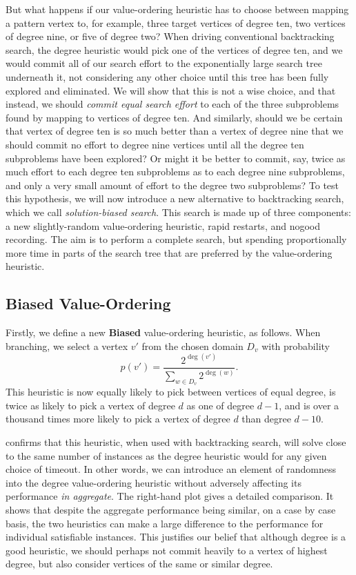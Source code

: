 \documentclass[runningheads]{llncs}
\begin{document}
But what happens if our value-ordering heuristic has to choose between mapping a pattern vertex to,
for example, three target vertices of degree ten, two vertices of degree nine, or five of degree
two? When driving conventional backtracking search, the degree heuristic would pick one of the
vertices of degree ten, and we would commit all of our search effort to the exponentially large
search tree underneath it, not considering any other choice until this tree has been fully explored
and eliminated.  We will show that this is not a wise choice, and that instead, we should
\emph{commit equal search effort} to each of the three subproblems found by mapping to vertices of
degree ten.  And similarly, should we be certain that vertex of degree ten is so much better than a
vertex of degree nine that we should commit no effort to degree nine vertices until all the degree
ten subproblems have been explored? Or might it be better to commit, say, twice as much effort to
each degree ten subproblems as to each degree nine subproblems, and only a very small amount of
effort to the degree two subproblems?  To test this hypothesis, we will now introduce a new
alternative to backtracking search, which we call \emph{solution-biased search}.  This search is
made up of three components: a new slightly-random value-ordering heuristic, rapid restarts, and
nogood recording. The aim is to perform a complete search, but spending proportionally more time in
parts of the search tree that are preferred by the value-ordering heuristic.

\subsection{Biased Value-Ordering}

Firstly, we define a new \textbf{Biased} value-ordering heuristic, as follows. When branching, we
select a vertex $v'$ from the chosen domain $D_v$ with probability \[ p(v') =
\frac{2^{\deg(v')}}{\sum_{w \in D_v}{2^{\deg(w)}}} \text{.} \] This heuristic is now equally likely
to pick between vertices of equal degree, is twice as likely to pick a vertex of degree $d$ as one
of degree $d - 1$, and is over a thousand times more likely to pick a vertex of degree $d$ than
degree $d - 10$.

 confirms that this heuristic, when used with backtracking
search, will solve close to the same number of instances as the degree heuristic would for any given
choice of timeout. In other words, we can introduce an element of randomness into the degree
value-ordering heuristic without adversely affecting its performance \emph{in aggregate}.  The
right-hand plot gives a detailed comparison. It shows that despite the aggregate performance being
similar, on a case by case basis, the two heuristics can make a large difference to the performance
for individual satisfiable instances. This justifies our belief that although degree is a good
heuristic, we should perhaps not commit heavily to a vertex of highest degree, but also consider
vertices of the same or similar degree.
\end{document}
